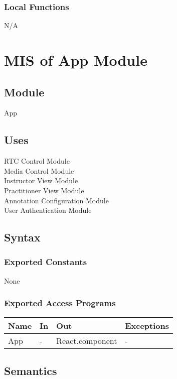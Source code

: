 \documentclass[12pt, titlepage]{article}
\begin{document}
\subsubsection{Local Functions}
N/A

\section{MIS of App Module}
\label{sec:appmodule}

\subsection{Module}
App

\subsection{Uses}
RTC Control Module\\
Media Control Module\\
Instructor View Module\\
Practitioner View Module\\
Annotation Configuration Module\\
User Authentication Module

\subsection{Syntax}

\subsubsection{Exported Constants}
None

\subsubsection{Exported Access Programs}
\begin{table}[h!]
  \centering
  \begin{tabular}{llll}
    \toprule
    \textbf{Name} & \textbf{In} & \textbf{Out}            & \textbf{Exceptions} \\
    \midrule
    App           & -           & React.component         & -                   \\
    \bottomrule
  \end{tabular}
\end{table}

\subsection{Semantics}
\end{document}
